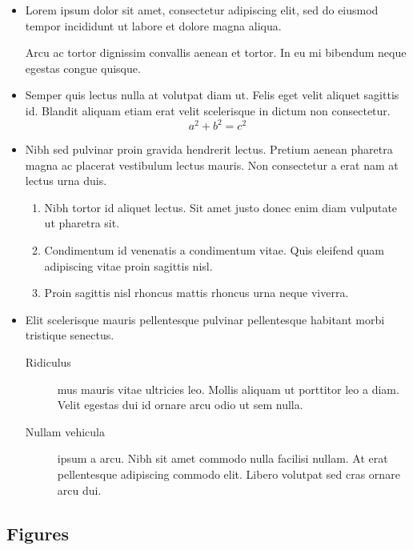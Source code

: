 \documentclass[12pt]{report}
\begin{document}
    \begin{itemize}[leftmargin=*]
        \item Lorem ipsum dolor sit amet, consectetur adipiscing elit, sed do eiusmod tempor incididunt ut labore et dolore magna aliqua.

        Arcu ac tortor dignissim convallis aenean et tortor. In eu mi bibendum neque egestas congue quisque.

        \item[$+$] Semper quis lectus nulla at volutpat diam ut. Felis eget velit aliquet sagittis id. Blandit aliquam etiam erat velit scelerisque in dictum non consectetur.
        \begin{equation}
            a^2 + b^2 = c^2
        \end{equation}

        \item Nibh sed pulvinar proin gravida hendrerit lectus. Pretium aenean pharetra magna ac placerat vestibulum lectus mauris. Non consectetur a erat nam at lectus urna duis.
        \begin{enumerate}[noitemsep, label=\roman*.]
            \item Nibh tortor id aliquet lectus. Sit amet justo donec enim diam vulputate ut pharetra sit.
            \setcounter{enumi}{3}
            \item Condimentum id venenatis a condimentum vitae. Quis eleifend quam adipiscing vitae proin sagittis nisl.
            \addtocounter{enumi}{15}
            \item Proin sagittis nisl rhoncus mattis rhoncus urna neque viverra.
        \end{enumerate}

        \item Elit scelerisque mauris pellentesque pulvinar pellentesque habitant morbi tristique senectus.
            \begin{description}
                \item[Ridiculus] mus mauris vitae ultricies leo. Mollis aliquam ut porttitor leo a diam. Velit egestas dui id ornare arcu odio ut sem nulla.
                \item[Nullam vehicula] ipsum a arcu. Nibh sit amet commodo nulla facilisi nullam. At erat pellentesque adipiscing commodo elit. Libero volutpat sed cras ornare arcu dui.
            \end{description}
    \end{itemize}

    \subsection{Figures}
\end{document}
